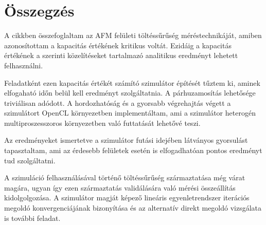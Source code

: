 \section{Összegzés}
	A cikkben összefoglaltam az AFM felületi töltéssűrűség méréstechnikáját, amiben azonosítottam a
	kapacitás értékének kritikus voltát. Ezidáig a kapacitás értékének a \cite{Hudlet1998,Butt20051}
	szerinti közelítéseket tartalmazó analitikus eredményt lehetett felhasználni.
	
	Feladatként ezen kapacitás értékét számító szimulátor építését tűztem ki, aminek elfogaható időn
	belül kell eredményt szolgáltatnia. A párhuzamosítás lehetősége triviálisan adódott.
	A hordozhatóság és a gyorsabb végrehajtás végett a szimulátort OpenCL 
	környezetben implementáltam, ami a szimulátor heterogén multiproszesszoros környezetben való
	futtatását lehetővé teszi.
	
	Az eredményeket ismertetve a szimulátor futási idejében látványos gyorsulást tapasztaltam, ami
	az érdesebb felületek esetén is elfogadhatóan pontos eredményt tud szolgáltatni. 
	
	A szimuláció felhasználásával történő töltéssűrűség származtatása még várat magára, ugyan így ezen
	származtatás validálására való mérési összeállítás kidolgolgozása.
	A szimulátor magját képező lineáris egyenletrendszer iterációs megoldó
	konvergenciájának bizonyítása és az alternatív direkt megoldó vizsgálata is további feladat.
